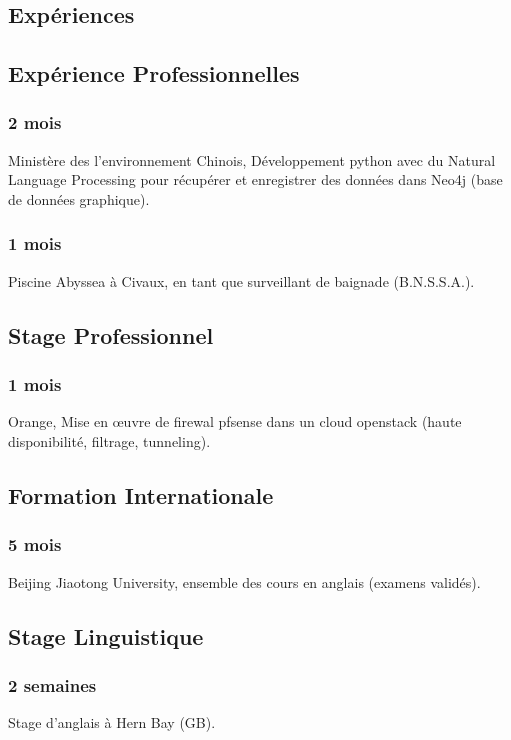 \documentclass{article}
\begin{document}
    \vspace{1cm}

    \begin{multicols}{2}
        \section{Exp\'eriences}
            \subsection{Exp\'erience Professionnelles}
                \subsubsection{2 mois}
                    Minist\`ere des l'environnement Chinois, D\'eveloppement python avec du Natural Language Processing pour r\'ecup\'erer et enregistrer des donn\'ees dans Neo4j (base de donn\'ees graphique).
                \subsubsection{1 mois}
                    Piscine Abyssea \`a Civaux, en tant que surveillant de baignade (B.N.S.S.A.).
            \subsection{Stage Professionnel}
                \subsubsection{1 mois}
                    Orange, Mise en \oe{}uvre de firewal pfsense dans un cloud openstack (haute disponibilit\'e, filtrage, tunneling).
            \subsection{Formation Internationale}
                \subsubsection{5 mois}
                    Beijing Jiaotong University, ensemble des cours en anglais (examens valid\'es).
            \subsection{Stage Linguistique}
                \subsubsection{2 semaines}
                    Stage d'anglais \`a Hern Bay (GB).


\end{multicols}
\end{document}
